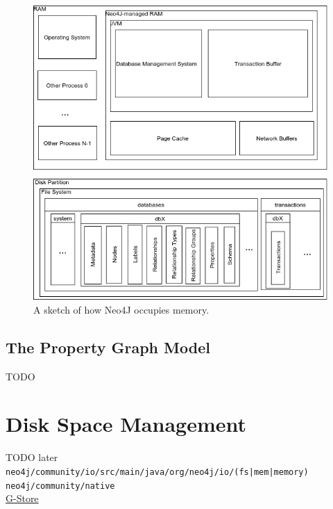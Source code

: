 \documentclass[a4paper,10pt]{article}
\begin{document}
\begin{figure}[htp]\label{N4J_memory_view}
 \begin{center}
  \includegraphics[keepaspectratio,width=\textwidth]{img/00_intro/N4J_memory_view.png}
 \end{center}
 \caption{A sketch of how Neo4J occupies memory.} %
\end{figure}

\subsection{The Property Graph Model}
TODO

\newpage


\section{Disk Space Management}
TODO later \\
\texttt{neo4j/community/io/src/main/java/org/neo4j/io/(fs|mem|memory)} \\
\texttt{neo4j/community/native} \\
\href{http://g-store.sourceforge.net/th/index.htm}{G-Store} \\

 \newpage

 
\end{document}
